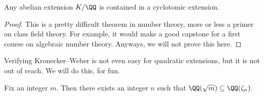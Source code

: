 \documentclass[../notes.tex]{subfiles}
\begin{document}
\begin{theorem}
	Any abelian extension $K/\QQ$ is contained in a cyclotomic extension.
\end{theorem}
\begin{proof}
	This is a pretty difficult theorem in number theory, more or less a primer on class field theory. For example, it would make a good capstone for a first course on algebraic number theory. Anyways, we will not prove this here.
\end{proof}
Verifying Kronecker--Weber is not even easy for quadratic extensions, but it is not out of reach. We will do this, for fun.
\begin{exe}[Nir] \label{exe:quadratickw}
	Fix an integer $m.$ Then there exists an integer $n$ such that $\QQ(\sqrt m)\subseteq\QQ(\zeta_n).$
\end{exe}
\end{document}
